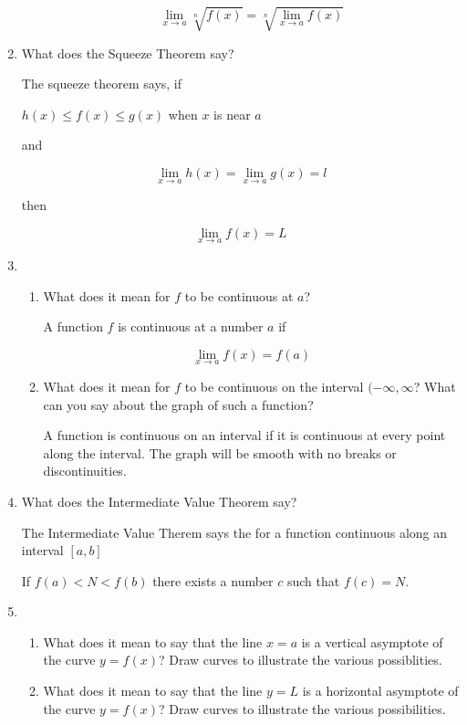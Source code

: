 \documentclass{article}
\begin{document}
\begin{enumerate}
\begin{enumerate}
			$$\lim \limits _{x \to a} \sqrt[n]{f(x)} = \sqrt[n]{\lim \limits _{x \to a} f(x)}$$

		\end{enumerate}

		\item What does the Squeeze Theorem say?

		The squeeze theorem says, if

		$h(x) \leq f(x) \leq g(x)$ when $x$ is near $a$

		and 

		$$\lim \limits _{x \to a} h(x) = \lim \limits _{x \to a} g(x) = l$$

		then

		$$\lim \limits _{x \to a} f(x) = L$$

		\item
		\begin{enumerate}
			\item What does it mean for $f$ to be continuous at $a$?

			A function $f$ is continuous at a number $a$ if

			$$\lim \limits _{x \to a} f(x) = f(a)$$

			\item What does it mean for $f$ to be continuous on the
			interval $(-\infty, \infty$? What can you say about the
			graph of such a function?

			A function is continuous on an interval if it is continuous
			at every point along the interval. The graph will be smooth
			with no breaks or discontinuities.
		\end{enumerate}

		\item What does the Intermediate Value Theorem say?

		The Intermediate Value Therem says the for a function continuous
		along an interval $[a, b]$

		If $f(a) < N < f(b)$ there exists a number $c$ such that $f(c) = N$.


		\item
		\begin{enumerate}
			\item What does it mean to say that the line $x = a$ is a 
			vertical asymptote of the curve $y = f(x)$? Draw curves
			to illustrate the various possiblities.

			\item What does it mean to say that the line $y = L$ is a
			horizontal asymptote of the curve $y = f(x)$? Draw curves
			to illustrate the various possibilities.
		\end{enumerate}
	\end{enumerate}
\end{document}
